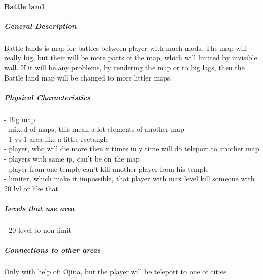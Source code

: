 \documentclass[parskip=full]{scrartcl}
\begin{document}
					\paragraph{Battle land}\vspace{-0.5cm}
						\subparagraph{General Description} \vspace{-0.5cm}
							\par \begingroup
							\leftskip=2cm
							\noindent
									Battle lands is map for battles between player with much mods. The map will really big, but their will be more parts of the map, which will limited by invisible wall. If it will be any problems, by rendering the map or to big lags, then the Battle land map will be changed to more littler maps.
							\par \endgroup
						\subparagraph{Physical Characteristics} \vspace{-0.5cm}
							\par \begingroup
							\leftskip=2cm
							\noindent
									- Big map \\
									- mixed of maps, this mean a lot elements of another map \\
									- 1 vs 1 area like a little rectangle \\
									- player, who will die more then x times in y time will do teleport to another map \\
									- players with same ip, can't be on the map \\
									- player from one temple can't kill another player from his temple \\
									- limiter, which make it impossible, that player with max level kill someone with 20 lvl or like that
							\par \endgroup
						\subparagraph{Levels that use area} \vspace{-0.5cm}
							\par \begingroup
							\leftskip=2cm
							\noindent
									- 20 level to non limit
							\par \endgroup
						\subparagraph{Connections to other areas} \vspace{-0.5cm}
							\par \begingroup
							\leftskip=2cm
							\noindent
									Only with help of: Ōjina, but the player will be teleport to one of cities
							\par \endgroup
\end{document}
